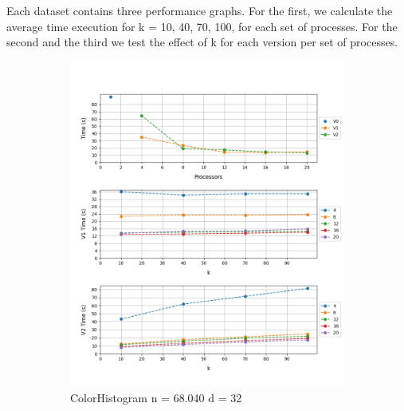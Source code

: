 \documentclass[12pt, a4paper]{article}
\begin{document}
Each dataset contains three performance graphs. For the first, we calculate the average time execution for k = 10, 40, 70, 100, for each set of processes. For the second and the third we test the effect of k for each version per set of processes. 
\begin{figure}[h!]
     \begin{subfigure}[b]{0.33\textwidth}
         \centering
         \includegraphics[height=.20\textheight, width=\textwidth, keepaspectratio]{assets/corel/histo.png}
    \caption{ColorHistogram n = 68.040 d = 32}
     \end{subfigure}
     \hfill
     \begin{subfigure}[b]{0.33\textwidth}
         \centering

\end{subfigure}
\end{figure}
\end{document}
